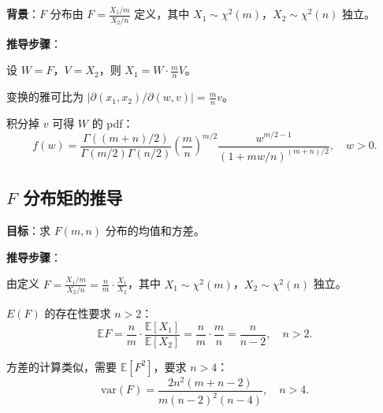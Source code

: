 \textbf{背景}：$F$ 分布由 $F = \frac{X_1/m}{X_2/n}$ 定义，其中 $X_1 \sim \chi^{2}(m)$，$X_2 \sim \chi^{2}(n)$ 独立。

\textbf{推导步骤}：

设 $W = F$，$V = X_2$，则 $X_1 = W \cdot \frac{m}{n} V$。

变换的雅可比为 $|\partial(x_1,x_2)/\partial(w,v)| = \frac{m}{n}v$。

积分掉 $v$ 可得 $W$ 的 pdf：
\[
f(w) = \frac{\Gamma((m+n)/2)}{\Gamma(m/2)\Gamma(n/2)} \left(\frac{m}{n}\right)^{m/2} \frac{w^{m/2-1}}{(1 + mw/n)^{(m+n)/2}}, \quad w > 0.
\]

\subsection{$F$ 分布矩的推导}\label{sec:derivation-f-moments}

\textbf{目标}：求 $F(m, n)$ 分布的均值和方差。

\textbf{推导步骤}：

由定义 $F = \frac{X_1/m}{X_2/n} = \frac{n}{m} \cdot \frac{X_1}{X_2}$，其中 $X_1 \sim \chi^{2}(m)$，$X_2 \sim \chi^{2}(n)$ 独立。

$E(F)$ 的存在性要求 $n > 2$：
\[
\mathbb{E}F = \frac{n}{m} \cdot \frac{\mathbb{E}[X_1]}{\mathbb{E}[X_2]} = \frac{n}{m} \cdot \frac{m}{n} = \frac{n}{n-2}, \quad n > 2.
\]

方差的计算类似，需要 $\mathbb{E}[F^{2}]$，要求 $n > 4$：
\[
\text{var}(F) = \frac{2n^{2}(m+n-2)}{m(n-2)^{2}(n-4)}, \quad n > 4.
\]

